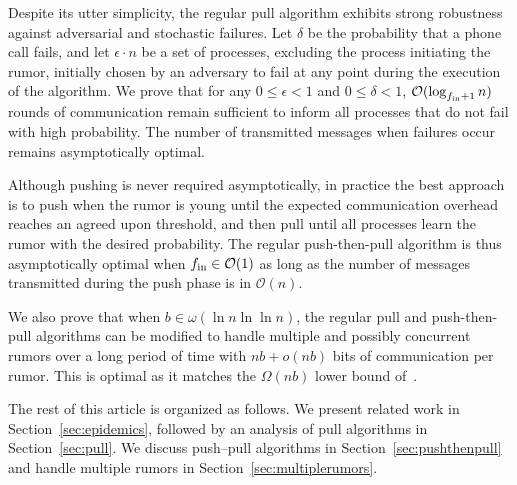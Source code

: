 Despite its utter simplicity, the regular pull algorithm exhibits strong robustness against adversarial and stochastic failures. Let $\delta$ be the probability that a phone call fails, and let $\epsilon \cdot n$ be a set of processes, excluding the process initiating the rumor, initially chosen by an adversary to fail at any point during the execution of the algorithm. We prove that for any $0 \leq \epsilon < 1$ and  $0 \leq \delta < 1$, $\mathcal{O}(\log_{f_\text{in}+1} n)$ rounds of communication remain sufficient to inform all processes that do not fail with high probability. The number of transmitted messages when failures occur remains asymptotically optimal.

Although pushing is never required asymptotically, in practice the best approach is to push when the rumor is young until the expected communication overhead reaches an agreed upon threshold, and then pull until all processes learn the rumor with the desired probability. The regular  push-then-pull algorithm is thus asymptotically optimal when $f_\text{in} \in \mathcal{O}(1)$ as long as the number of messages transmitted during the push phase is in $\mathcal{O}(n)$.

We also prove that when $b \in \omega(\ln n \ln \ln n)$, the regular pull and push-then-pull algorithms can be modified to handle multiple and possibly concurrent rumors over a long period of time with $nb + o(nb)$ bits of communication per rumor. This is optimal as it matches the $\Omega(nb)$ lower bound of~\cite{DBLP:conf/spaa/FraigniaudG10}. 


The rest of this article is organized as follows. We present related work in Section~\ref{sec:epidemics}, followed by an analysis of pull algorithms in Section~\ref{sec:pull}.
We discuss push--pull algorithms in Section~\ref{sec:pushthenpull} and handle multiple rumors in Section~\ref{sec:multiplerumors}. 


